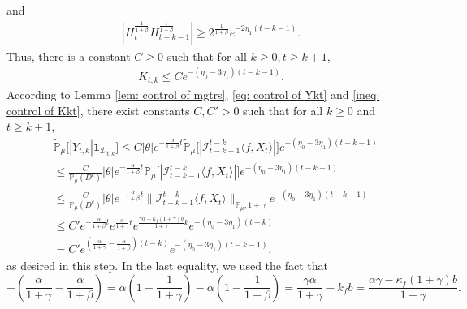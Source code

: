 \documentclass[12pt,a4paper]{amsart}
\theoremstyle{plain}
\theoremstyle{definition}
\numberwithin{equation}{section}
\begin{document}
    and
\begin{align*}
    |H_t^{\frac{1}{1+\beta}}H_{t-k-1}^{\frac{1}{1+\beta}}|
    \geq 2^{\frac{1}{1+\beta}} e^{-2\eta_1(t-k-1)}.
\end{align*}
    Thus, there is a constant $C\geq 0$ such that for all $k \geq 0, t\geq k+1$, 
\begin{equation}\begin{split}
\label{ineq: control of Kkt}
     K_{t,k}
     \leq C e^{-(\eta_0 - 3\eta_1)(t-k-1)}.
\end{split}\end{equation}
   According to Lemma \ref{lem: control of mgtrs}, \eqref{eq: control of Ykt} and  \eqref{ineq: control of Kkt},
    there exist constants $C,C'>0$ such that  for all $k\geq 0$ and $t\geq k+1$,
\begin{equation}\begin{split}
\label{eq: Y in D}
    &\mathbb{\tilde{P}}_{\mu}\big[|Y_{t,k}|\mathbf{1}_{\mathcal{D}_{t,k}}\big]
    \leq C|\theta|e^{-\frac{\alpha}{1+\beta}t}\mathbb{\tilde{P}}_{\mu}\big[|\mathcal{I}_{t-k-1}^{t-k}\langle f,X_t\rangle|\big]e^{-(\eta_0 - 3\eta_1)(t-k-1)}
    \\&\leq \frac{C}{\mathbb{P}_{\mu}(D^c)}|\theta|e^{-\frac{\alpha}{1+\beta}t}\mathbb{P}_{\mu}\big[|\mathcal{I}_{t-k-1}^{t-k}\langle f,X_t\rangle|\big]e^{-(\eta_0 - 3\eta_1)(t-k-1)}
    \\&\leq \frac{C}{\mathbb{P}_{\mu}(D^c)}|\theta|e^{-\frac{\alpha}{1+\beta}t}\|\mathcal{I}_{t-k-1}^{t-k}\langle f,X_t\rangle\|_{\mathbb P_\mu; 1+\gamma} e^{-(\eta_0 - 3\eta_1)(t-k - 1)}
    \\&\leq C' e^{-\frac{\alpha}{1+\beta}t}e^{\frac{\alpha}{1+\gamma}t}e^{\frac{\gamma \alpha-\kappa_f(1+\gamma)b}{1+\gamma}k}e^{-(\eta_0 - 3\eta_1)(t-k)}\\&= C' e^{(\frac{\alpha}{1+\gamma}-\frac{\alpha}{1+\beta})(t-k)}e^{-(\eta_0 - 3\eta_1)(t-k-1)},
\end{split}\end{equation}
    as desired in this step.
    In the last equality, we used the fact that
\[
    -(\frac{\alpha}{1+\gamma}-\frac{\alpha}{1+\beta})
    = \alpha(1-\frac{1}{1+\gamma}) - \alpha(1-\frac{1}{1+\beta})
    = \frac{\gamma \alpha}{1+\gamma} - k_f b
    =\frac{\alpha \gamma-\kappa_f(1+\gamma)b}{1+\gamma}.
\]
\end{document}
